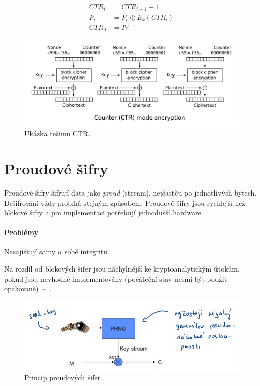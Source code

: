 \begin{equation}
\begin{aligned}
CTR_i &= CTR_{i-1} + 1 \\
P_i &= P_i \oplus E_k(CTR_i) \\
CTR_0 &= IV
\end{aligned}
\end{equation}

\begin{figure}[H]
    \centering
    \includegraphics[width=1\linewidth]{rezim_ctr.png}
    \caption{Ukázka režimu CTR.}
\end{figure}


\section{Proudové šifry}

Proudové šifry šifrují data jako \textit{proud} (stream), nejčastěji po jednotlivých bytech. Dešifrování vždy probíhá stejným způsobem. Proudové šifry jsou rychlejší než blokové šifry a pro implementaci potřebují jednodušší hardware.

\paragraph*{Problémy} \begin{compactitem}
    \item Nezajišťují samy o~sobě integritu.
    \item Na rozdíl od blokových šifer jsou náchylnější ke kryptoanalytickým útokům, pokud jsou nevhodně implementovány (počáteční stav nesmí být použit opakovaně)~--~.
\end{compactitem}

\begin{figure}[H]
    \centering
    \includegraphics[width=1\linewidth]{proudove.png}
    \caption{Princip proudových šifer.}
\end{figure}

